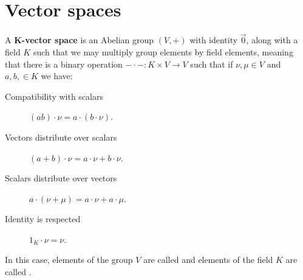 \documentclass{ximera}
\begin{document}

\section{Vector spaces}

\begin{definition}
  A \textbf{$\boldsymbol{K}$-vector space} is an Abelian group $(V,+)$
  with identity $\vec{0}$, along with a field $K$ such that we may
  multiply group elements by field elements, meaning that there is a
  binary operation $-\cdot-: K\times V \to V$ such that if $\nu,\mu\in
    V$ and $a,b,\in K$ we have:
  \begin{description}
    \item[Compatibility with scalars] $(ab)\cdot \nu = a\cdot (b\cdot \nu)$.
    \item[Vectors distribute over scalars] $(a+b)\cdot \nu =
        a\cdot\nu + b\cdot \nu$.
    \item[Scalars distribute over vectors] $a\cdot (\nu+\mu) =
        a\cdot \nu + a\cdot \mu$.
    \item[Identity is respected] $1_K\cdot \nu = \nu$.
  \end{description}
  In this case, elements of the group $V$ are called  and
  elements of the field $K$ are called .
\end{definition}
\end{document}
